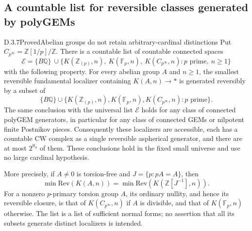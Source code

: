 \subsection*{A countable list for reversible classes generated by polyGEMs}

\begin{claim}{D.3.7}{Proved}{Abelian groups do not retain arbitrary-cardinal distinctions}
\label{D37GEMnormalform}
Put $C_{p^\infty}=\mathbb Z[1/p]/\mathbb Z$.  There is a countable
list of countable connected spaces
\[
 \mathcal E=\{B\mathbb Q\}\ \cup
 \{K(\mathbb Z_{(p)},n),\ K(\mathbb F_p,n),\
                  K(C_{p^\infty},n):p\text{ prime},\ n\geq1\}
 \tag{D.3.7a}
\]
with the following property.  For every abelian group $A$ and $n\geq1$,
the smallest reversible fundamental localizer containing
$K(A,n)\to *$ is generated reversibly by a subset of
\[
 \{B\mathbb Q\}\cup
 \{K(\mathbb Z_{(p)},n),K(\mathbb F_p,n),
                          K(C_{p^\infty},n):p\text{ prime}\}.
 \tag{D.3.7b}
\]
The same conclusion with the universal list $\mathcal E$ holds for
any class of connected polyGEM generators, in particular for any
class of connected GEMs or nilpotent finite Postnikov pieces.
Consequently these localizers
are accessible, each has a countable CW complex as a single reversible
aspherical generator, and there are at most $2^{\aleph_0}$ of them.
These conclusions hold in the fixed small universe and use no large
cardinal hypothesis.

More precisely, if $A\ne0$ is torsion-free and
$J=\{p:pA=A\}$, then
\[
 \min\mathrm{Rev}(K(A,n))
    =\min\mathrm{Rev}(K(\mathbb Z[J^{-1}],n)).
 \tag{D.3.7c}
\]
For a nonzero $p$-primary torsion group $A$, its ordinary nullity,
and hence its reversible closure, is that of $K(C_{p^\infty},n)$
if $A$ is divisible, and that of $K(\mathbb F_p,n)$ otherwise.
The list is a list of sufficient normal forms; no assertion that all
its subsets generate distinct localizers is intended.
\end{claim}

